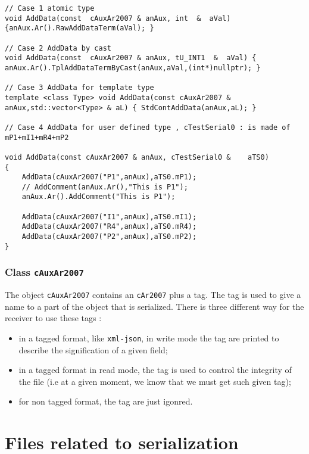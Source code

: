 \begin{verbatim}
// Case 1 atomic type
void AddData(const  cAuxAr2007 & anAux, int  &  aVal) {anAux.Ar().RawAddDataTerm(aVal); }

// Case 2 AddData by cast
void AddData(const  cAuxAr2007 & anAux, tU_INT1  &  aVal) { anAux.Ar().TplAddDataTermByCast(anAux,aVal,(int*)nullptr); }

// Case 3 AddData for template type
template <class Type> void AddData(const cAuxAr2007 & anAux,std::vector<Type> & aL) { StdContAddData(anAux,aL); }

// Case 4 AddData for user defined type , cTestSerial0 : is made of mP1+mI1+mR4+mP2

void AddData(const cAuxAr2007 & anAux, cTestSerial0 &    aTS0)
{
    AddData(cAuxAr2007("P1",anAux),aTS0.mP1);
    // AddComment(anAux.Ar(),"This is P1");
    anAux.Ar().AddComment("This is P1");

    AddData(cAuxAr2007("I1",anAux),aTS0.mI1);
    AddData(cAuxAr2007("R4",anAux),aTS0.mR4);
    AddData(cAuxAr2007("P2",anAux),aTS0.mP2);
}
\end{verbatim}


\subsubsection{Class {\tt cAuxAr2007}}

The object {\tt cAuxAr2007} contains an {\tt cAr2007} plus   a tag.
The tag is used to give a name to a part of the object that is serialized.
There is three different way for the receiver to use these tags :

\begin{itemize}
    \item in a tagged format, like {\tt xml-json}, in write mode the
	    tag are printed to describe the signification of a given field;

    \item in a tagged format in read mode, the tag is used to control the integrity
	    of the file (i.e at a given moment, we know that we must get such given tag);

    \item for non tagged format, the tag are just igonred.
\end{itemize}




\section{Files related to serialization}

